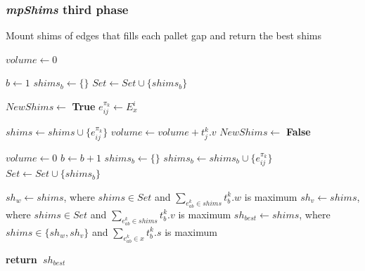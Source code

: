 \documentclass[preprint,authoryear]{elsarticle}
\renewcommand{\Return}{\State \bf {return}~}
\begin{document}
\subsubsection{{\it mpShims} third phase}

\begin{algorithm}[H]
	\caption{Mount shims of edges that fills each pallet gap and return the best shims}  \label{alg:getBestShims}
	\begin{algorithmic}[1]
		
		
		\State $volume \gets 0$	
		
		\State $b \gets 1$
		\State $shims_b \gets \{\}$  \label{empty_shims}
		\State $Set \gets Set \cup \{shims_b\}$ \label{empty_set}
		
		 \label{edges_indexes}
		
		
		\State $NewShims \gets$ {\bf True} \label{new_shims}
		\State $e_{ij}^{\pi_k} \gets E_x^i$
		
		 \label{shims_set}
		
		
		
		\State $shims \gets shims \cup \{e_{ij}^{\pi_k}\}$
		\State $volume \gets volume + t_j^k.v$
		\State $NewShims \gets$ {\bf False} \label{new_shims_false}
		
		
		\EndIf
		
		\EndFor 
		
		 \label{new_shims2}
		\State $volume \gets 0$
		\State $b \gets b + 1$
		\State $shims_b \gets \{\}$
		\State $shims_b \gets shims_b \cup \{e_{ij}^{\pi_k}\}$
		\State $Set \gets Set \cup \{shims_b\}$
		\EndIf
		
		\EndFor 
		
		\State $sh_w \gets shims$, where $shims \in Set$ and $\sum_{e_{ab}^k \in shims} t_b^k.w$ is maximum  \label{best_weight}		
		\State $sh_v \gets shims$, where $shims \in Set$ and $\sum_{e_{ab}^k \in shims} t_b^k.v$ is maximum \label{best_volume}
		\State $sh_{best} \gets shims$, where $shims \in \{sh_w, sh_v\}$ and $\sum_{e_{ab}^k \in x} t_b^k.s$ is maximum \label{best_score}
		
		\Return $sh_{best}$
		
		\EndProcedure
		
	\end{algorithmic}
\end{algorithm}
\end{document}
